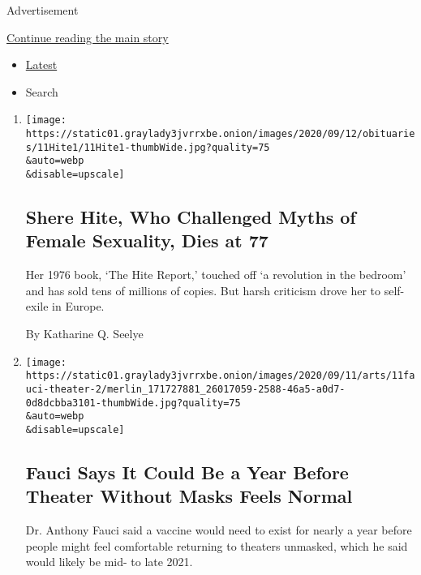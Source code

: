 Advertisement

\protect\hyperlink{after-mid2}{Continue reading the main story}

\begin{itemize}
\tightlist
\item
  \protect\hyperlink{stream-panel}{Latest}
\item
  Search
\end{itemize}

\begin{enumerate}
\def\labelenumi{\arabic{enumi}.}
\item
  \href{/2020/09/11/books/shere-hite-dead.html}{}

  \texttt{[image: https://static01.graylady3jvrrxbe.onion/images/2020/09/12/obituaries/11Hite1/11Hite1-thumbWide.jpg?quality=75\\\&auto=webp\\\&disable=upscale]}

  \hypertarget{shere-hite-who-challenged-myths-of-female-sexuality-dies-at-77}{%
  \subsection{Shere Hite, Who Challenged Myths of Female Sexuality, Dies
  at
  77}\label{shere-hite-who-challenged-myths-of-female-sexuality-dies-at-77}}

  Her 1976 book, `The Hite Report,' touched off `a revolution in the
  bedroom' and has sold tens of millions of copies. But harsh criticism
  drove her to self-exile in Europe.

  By Katharine Q. Seelye
\item
  \href{/2020/09/11/theater/fauci-theater-reopen.html}{}

  \texttt{[image: https://static01.graylady3jvrrxbe.onion/images/2020/09/11/arts/11fauci-theater-2/merlin\_171727881\_26017059-2588-46a5-a0d7-0d8dcbba3101-thumbWide.jpg?quality=75\\\&auto=webp\\\&disable=upscale]}

  \hypertarget{fauci-says-it-could-be-a-year-before-theater-without-masks-feels-normal}{%
  \subsection{Fauci Says It Could Be a Year Before Theater Without Masks
  Feels
  Normal}\label{fauci-says-it-could-be-a-year-before-theater-without-masks-feels-normal}}

  Dr. Anthony Fauci said a vaccine would need to exist for nearly a year
  before people might feel comfortable returning to theaters unmasked,
  which he said would likely be mid- to late 2021.


\end{enumerate}
